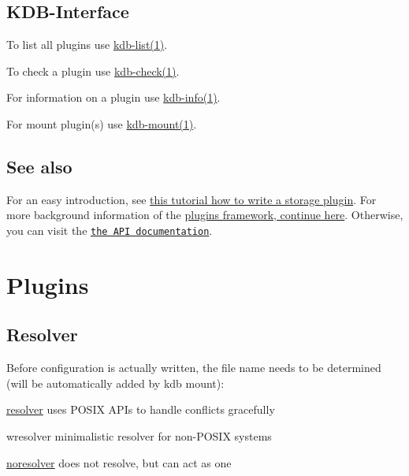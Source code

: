 \subsection*{K\+D\+B-\/\+Interface}


\begin{DoxyItemize}
\item To list all plugins use \hyperlink{md_doc_help_kdb-list_doc_help_kdb-list_md}{kdb-\/list(1)}.
\item To check a plugin use \hyperlink{md_doc_help_kdb-check_doc_help_kdb-check_md}{kdb-\/check(1)}.
\item For information on a plugin use \hyperlink{md_doc_help_kdb-info_doc_help_kdb-info_md}{kdb-\/info(1)}.
\item For mount plugin(s) use \hyperlink{md_doc_help_kdb-mount_doc_help_kdb-mount_md}{kdb-\/mount(1)}.
\end{DoxyItemize}

\subsection*{See also}

For an easy introduction, see \hyperlink{doc_tutorials_plugins_md}{this tutorial how to write a storage plugin}. For more background information of the \hyperlink{md_doc_help_elektra-plugins-framework_doc_help_elektra-plugins-framework_md}{plugins framework, continue here}. Otherwise, you can visit the \href{http://doc.libelektra.org/api/current/html/group__plugin.html}{\tt the A\+P\+I documentation}.

\section*{Plugins}

\subsection*{Resolver}

Before configuration is actually written, the file name needs to be determined (will be automatically added by kdb mount)\+:


\begin{DoxyItemize}
\item \hyperlink{md_src_plugins_resolver_README_src_plugins_resolver_README_md}{resolver} uses P\+O\+S\+I\+X A\+P\+Is to handle conflicts gracefully
\item wresolver minimalistic resolver for non-\/\+P\+O\+S\+I\+X systems
\item \hyperlink{md_src_plugins_noresolver_README_src_plugins_noresolver_README_md}{noresolver} does not resolve, but can act as one
\end{DoxyItemize}

